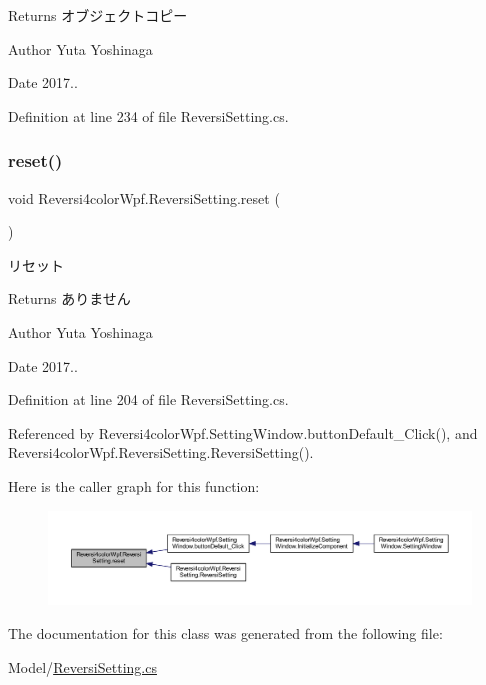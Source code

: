 \begin{DoxyReturn}{Returns}
オブジェクトコピー 
\end{DoxyReturn}
\begin{DoxyAuthor}{Author}
Yuta Yoshinaga 
\end{DoxyAuthor}
\begin{DoxyDate}{Date}
2017.. 
\end{DoxyDate}


Definition at line 234 of file Reversi\+Setting.\+cs.

\mbox{\label{class_reversi4color_wpf_1_1_reversi_setting_aa224dc25fde9486241a4b6087e57c04e}} 
\subsubsection{\texorpdfstring{reset()}{reset()}}
{\footnotesize\ttfamily void Reversi4color\+Wpf.\+Reversi\+Setting.\+reset (\begin{DoxyParamCaption}{ }\end{DoxyParamCaption})}



リセット 

\begin{DoxyReturn}{Returns}
ありません 
\end{DoxyReturn}
\begin{DoxyAuthor}{Author}
Yuta Yoshinaga 
\end{DoxyAuthor}
\begin{DoxyDate}{Date}
2017.. 
\end{DoxyDate}


Definition at line 204 of file Reversi\+Setting.\+cs.



Referenced by Reversi4color\+Wpf.\+Setting\+Window.\+button\+Default\+\_\+\+Click(), and Reversi4color\+Wpf.\+Reversi\+Setting.\+Reversi\+Setting().

Here is the caller graph for this function\+:
\nopagebreak
\begin{figure}[H]
\begin{center}
\leavevmode
\includegraphics[width=350pt]{class_reversi4color_wpf_1_1_reversi_setting_aa224dc25fde9486241a4b6087e57c04e_icgraph}
\end{center}
\end{figure}


The documentation for this class was generated from the following file\+:\begin{DoxyCompactItemize}
\item 
Model/\hyperlink{_reversi_setting_8cs}{Reversi\+Setting.\+cs}\end{DoxyCompactItemize}
